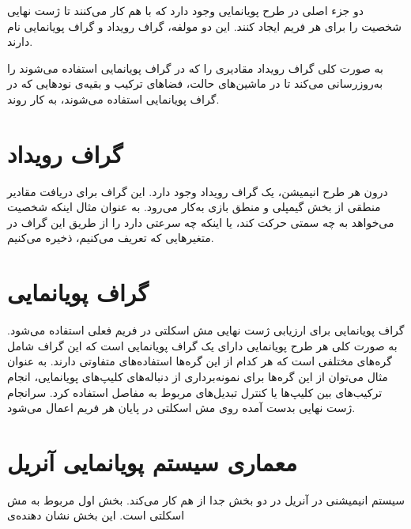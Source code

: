 دو جزء اصلی در طرح پویانمایی وجود دارد که با هم کار می‌کنند تا ژست نهایی شخصیت را برای هر 
فریم ایجاد کنند.
این دو مولفه، گراف رویداد و گراف پویانمایی نام دارند.

به صورت کلی گراف رویداد مقادیری را که در گراف پویانمایی استفاده می‌شوند را به‌روز‌رسانی می‌‌کند تا 
در ماشین‌های حالت، فضاهای ترکیب و بقیه‌ی نود‌هایی که در گراف پویانمایی
 استفاده می‌شوند، به کار روند.

\section{گراف رویداد}

درون هر طرح انیمیشن، یک گراف رویداد وجود دارد. 
این گراف برای دریافت مقادیر منطقی از بخش گیمپلی و منطق بازی به‌کار می‌رود.
به عنوان مثال اینکه شخصیت می‌خواهد به چه سمتی حرکت کند، یا اینکه چه سرعتی دارد را 
از طریق این گراف در متغیرهایی که تعریف می‌کنیم، ذخیره می‌کنیم.
\cite{EventGraphUnrealEngine}
\section{گراف پویا‌نمایی}

گراف پویانمایی برای ارزیابی ژست نهایی مش اسکلتی در فریم فعلی استفاده می‌شود.
به صورت کلی هر طرح پویانمایی دارای یک گراف پویانمایی است که 
این گراف شامل گره‌های مختلفی است که هر کدام از این گره‌ها استفاده‌های متفاوتی دارند.
به عنوان مثال می‌توان از این گره‌ها برای نمونه‌برداری
از دنباله‌های کلیپ‌های پویانمایی،
انجام ترکیب‌های بین کلیپ‌ها 
یا کنترل تبدیل‌های مربوط به مفاصل استفاده کرد.
سرانجام ژست نهایی بدست آمده روی 
مش اسکلتی در پایان هر فریم اعمال می‌شود.

\cite{AnimationGraphUnrealEngine}

\section {معماری سیستم پویانمایی آنریل}

سیستم انیمیشنی در آنریل در دو بخش جدا از هم کار می‌کند.
بخش اول مربوط به مش اسکلتی است. این بخش نشان دهنده‌ی 